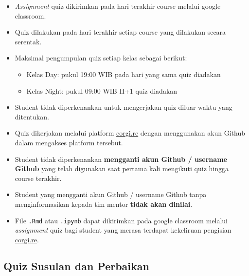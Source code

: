 \documentclass[
]{book}
\providecommand{\tightlist}{%
  \setlength{\itemsep}{0pt}\setlength{\parskip}{0pt}}
\begin{document}
\begin{itemize}
\tightlist
\item
  \emph{Assignment} quiz dikirimkan pada hari terakhir course melalui google classroom.
\item
  Quiz dilakukan pada hari terakhir setiap course yang dilakukan secara serentak.
\item
  Maksimal pengumpulan quiz setiap kelas sebagai berikut:

  \begin{itemize}
  \tightlist
  \item
    Kelas Day: pukul 19:00 WIB pada hari yang sama quiz diadakan
  \item
    Kelas Night: pukul 09:00 WIB H+1 quiz diadakan
  \end{itemize}
\item
  Student tidak diperkenankan untuk mengerjakan quiz diluar waktu yang ditentukan.
\item
  Quiz dikerjakan melalui platform \href{https://corgi.re}{corgi.re} dengan menggunakan akun Github dalam mengakses platform tersebut.
\item
  Student tidak diperkenankan \textbf{mengganti akun Github / username Github} yang telah digunakan saat pertama kali mengikuti quiz hingga course terakhir.
\item
  Student yang mengganti akun Github / username Github tanpa menginformasikan kepada tim mentor \textbf{tidak akan dinilai}.
\item
  File \texttt{.Rmd} atau \texttt{.ipynb} dapat dikirimkan pada google classroom melalui \emph{assignment} quiz bagi student yang merasa terdapat kekeliruan pengisian \href{https://corgi.re}{corgi.re}.
\end{itemize}

\hypertarget{quiz-susulan-dan-perbaikan}{%
\subsection{Quiz Susulan dan Perbaikan}\label{quiz-susulan-dan-perbaikan}}
\end{document}
